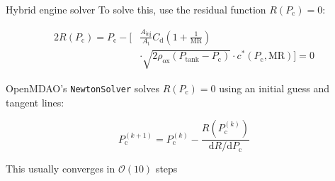 \begin{frame}{Hybrid engine solver}
  To solve this, use the residual function $R(P_\text{c}) = 0$:

  \begin{alignat*}{2}
    R(P_\text{c})
    = P_\text{c}
    - \bigg[ & \frac{A_\text{inj}}{A_\text{t}}
               C_\mathrm{d} \left(1 + \frac{1}{\mathrm{MR}}\right) \\
             & \cdot \sqrt{2\rho_\text{ox} (P_\text{tank} - P_\text{c})}
               \cdot c^* (P_\text{c}, \mathrm{MR}) \bigg] = 0
  \end{alignat*}

  OpenMDAO's \lstinline{NewtonSolver} solves $R(P_\text{c})=0$ using an initial
  guess and tangent lines:

  \begin{equation*}
    P_\text{c}^{(k+1)}
    = P_\text{c}^{(k)}
    - \frac{R(P_\text{c}^{(k)})}{\mathrm{d} R / \mathrm{d} P_\text{c}}
  \end{equation*}

  This usually converges in $\mathcal O(10)$ steps
\end{frame}
